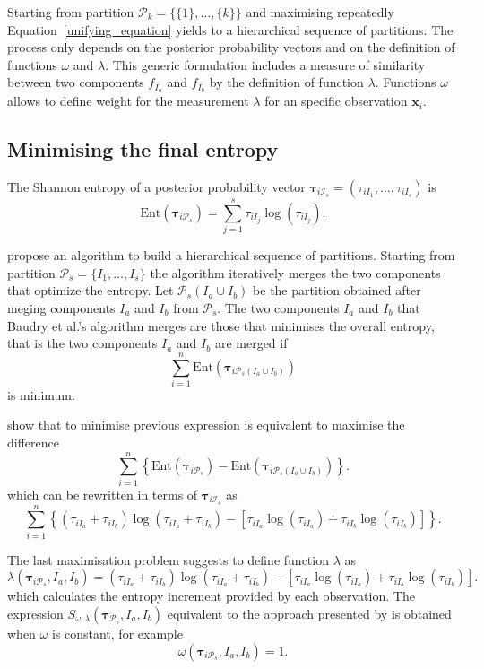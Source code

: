 \documentclass[10pt, a4paper]{article}
\newcommand{\m}[1]{\boldsymbol{#1}}
\begin{document}
\begin{spacing}{1.9}
Starting from partition $\mathcal{P}_k = \{ \{1\}, \dots, \{k\} \}$ and maximising repeatedly Equation~\ref{unifying_equation} yields to a hierarchical sequence of partitions. The process only depends on the posterior probability vectors and on the definition of functions $\omega$ and $\lambda$. This generic formulation includes a measure of similarity between two components $f_{I_a}$ and $f_{I_b}$ by the definition of function $\lambda$. Functions $\omega$ allows to define weight for the measurement $\lambda$ for an specific observation $\m x_i$.

\subsection{Minimising the final entropy}
\label{entropy_section}

The Shannon entropy of a posterior probability vector $\m\tau_{i \mathcal{I}_s} = \left( \tau_{i I_1} , \dots, \tau_{i I_s}  \right)$ is
\[
\text{Ent}( \m\tau_{i \mathcal{P}_s} ) = \sum_{j=1}^s \tau_{i I_j}  \log(\tau_{i I_j} ).
\]


\cite{baudry2010combining} propose an algorithm to build a hierarchical sequence of partitions. Starting from partition $\mathcal{P}_s = \{ I_1, \dots, I_s\}$ the algorithm iteratively merges  the two components that optimize the entropy. Let $\mathcal{P}_s(I_a\cup I_b)$ be the partition obtained after meging components $I_a$ and $I_b$ from $\mathcal{P}_s$. The two components $I_a$ and $I_b$ that Baudry et al.'s algorithm merges are those that minimises the overall entropy, that is the two components $I_a$ and $I_b$ are merged if
\[
\sum_{i=1}^n \text{Ent}( \m\tau_{i \mathcal{P}_s(I_a\cup I_b)} )
\]
is minimum.


\cite{baudry2010combining}  show that to minimise previous expression is equivalent to maximise the difference
\[
\sum_{i=1}^n  \left\{ \text{Ent}( \m\tau_{i \mathcal{P}_s} ) - \text{Ent}( \m\tau_{i \mathcal{P}_s(I_a\cup I_b)} ) \right\}.
\]
which can be rewritten in terms of $\m\tau_{i \mathcal{I}_s}$ as
\begin{equation}\label{entropy}
\sum_{i=1}^n   \left\{(\tau_{iI_a}+\tau_{iI_b}) \log(\tau_{iI_a} + \tau_{iI_b}) - \left[\tau_{iI_a} \log(\tau_{iI_a}) + \tau_{iI_b} \log(\tau_{iI_b})\right] \right\}.
\end{equation}


The last maximisation problem suggests to define function $\lambda$ as
\[
\lambda(\m\tau_{i \mathcal{P}_s},  I_a,  I_b) =  (\tau_{iI_a}+\tau_{iI_b}) \log(\tau_{iI_a} + \tau_{iI_b}) - \left[ \tau_{iI_a} \log(\tau_{iI_a}) + \tau_{iI_b} \log(\tau_{iI_b}) \right].
\]
which calculates the entropy increment provided by each observation. The expression $S_{\omega, \lambda}( \m\tau_{\mathcal{P}_s},  I_a,  I_b) $ equivalent to the approach presented by \cite{baudry2010combining} is obtained when $\omega$ is constant, for example 
\[
\omega(\m\tau_{i \mathcal{P}_s},  I_a,  I_b) = 1.
\]


\end{spacing}
\end{document}
